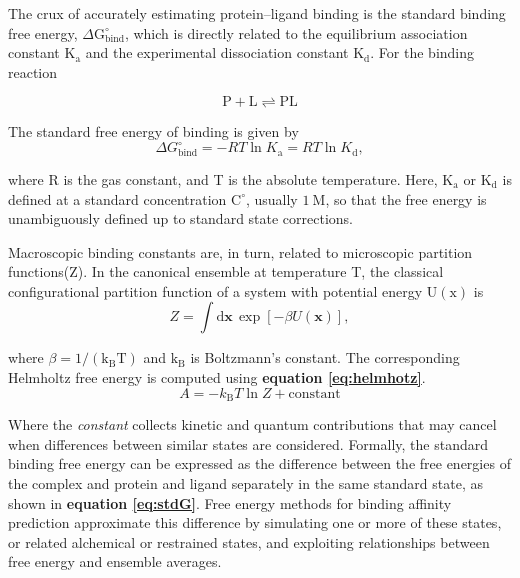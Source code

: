 \documentclass[12pt]{article}
\begin{document}
The crux of accurately estimating protein--ligand binding is the standard binding free energy, $\Delta \textrm{G}^\circ_\textrm{bind}$, which is directly related to the equilibrium association constant $\textrm{K}_\textrm{a}$ and the experimental dissociation constant $\textrm{K}_\textrm{d}$. 
For the binding reaction

\begin{equation}
\mathrm{P} + \mathrm{L} \rightleftharpoons \mathrm{PL}
\end{equation}

The standard free energy of binding is given by
\begin{equation}
\Delta G^\circ_\mathrm{bind} = -RT \ln K_\mathrm{a} = RT \ln K_\mathrm{d}, 
\end{equation}

where R is the gas constant, and T is the absolute temperature. 
Here, $\textrm{K}_\textrm{a}$ or $\textrm{K}_\textrm{d}$ is defined at a standard concentration $\textrm{C}^\circ$, usually $\textrm{1}\ \textrm{M}$, so that the free energy is unambiguously defined up to standard state corrections. 

Macroscopic binding constants are, in turn, related to microscopic partition functions(Z). In the canonical ensemble at temperature T, the classical configurational partition function of a system with potential energy $\textrm{U}(\text{x})$ is
\begin{equation}
Z = \int \mathrm{d}\mathbf{x}\, \exp[-\beta U(\mathbf{x})],
\end{equation}

where $\beta = \textrm{1}/(\textrm{k}_\textrm{B}\textrm{T})$ and $\textrm{k}_\textrm{B}$ is Boltzmann's constant. 
The corresponding Helmholtz free energy is computed using \textbf{equation \ref{eq:helmhotz}}.
\begin{equation}
A = -k_\mathrm{B} T \ln Z + \text{constant}
\label{eq:helmhotz}
\end{equation}

Where the \emph{constant} collects kinetic and quantum contributions that may cancel when differences between similar states are considered\cite{CH10_zwanzig1954high,CH10_chipot2007free}. Formally, the standard binding free energy can be expressed as the difference between the free energies of the complex and protein and ligand separately in the same standard state, as shown in \textbf{equation \ref{eq:stdG}}. Free energy methods for binding affinity prediction approximate this difference by simulating one or more of these states, or related alchemical or restrained states, and exploiting relationships between free energy and ensemble averages.
\end{document}
